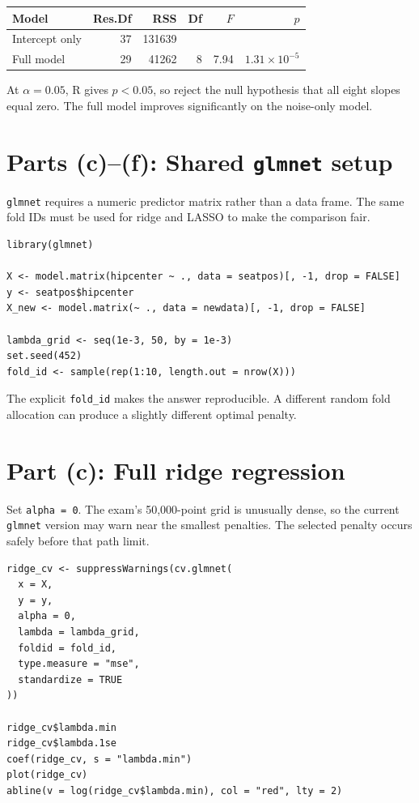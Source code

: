 ﻿\documentclass[11pt]{article}
\begin{document}
\begin{center}
\begin{tabular}{lrrrrr}
\toprule
\rowcolor{navy!10}\textbf{Model}&\textbf{Res.Df}&\textbf{RSS}&\textbf{Df}&\textbf{$F$}&\textbf{$p$}\\
\midrule
Intercept only&37&131639&&&\\
Full model&29&41262&8&7.94&$1.31\times10^{-5}$\\
\bottomrule
\end{tabular}
\end{center}

At $\alpha=0.05$, R gives $p<0.05$, so reject the null hypothesis that all
eight slopes equal zero. The full model improves significantly on the
noise-only model.

\section{Parts (c)--(f): Shared \texttt{glmnet} setup}

\texttt{glmnet} requires a numeric predictor matrix rather than a data frame.
The same fold IDs must be used for ridge and LASSO to make the comparison fair.

\begin{lstlisting}
library(glmnet)

X <- model.matrix(hipcenter ~ ., data = seatpos)[, -1, drop = FALSE]
y <- seatpos$hipcenter
X_new <- model.matrix(~ ., data = newdata)[, -1, drop = FALSE]

lambda_grid <- seq(1e-3, 50, by = 1e-3)
set.seed(452)
fold_id <- sample(rep(1:10, length.out = nrow(X)))
\end{lstlisting}

The explicit \texttt{fold\_id} makes the answer reproducible. A different random
fold allocation can produce a slightly different optimal penalty.

\section{Part (c): Full ridge regression}

Set \texttt{alpha = 0}. The exam's 50,000-point grid is unusually dense, so the
current \texttt{glmnet} version may warn near the smallest penalties. The selected
penalty occurs safely before that path limit.

\begin{lstlisting}
ridge_cv <- suppressWarnings(cv.glmnet(
  x = X,
  y = y,
  alpha = 0,
  lambda = lambda_grid,
  foldid = fold_id,
  type.measure = "mse",
  standardize = TRUE
))

ridge_cv$lambda.min
ridge_cv$lambda.1se
coef(ridge_cv, s = "lambda.min")
plot(ridge_cv)
abline(v = log(ridge_cv$lambda.min), col = "red", lty = 2)
\end{lstlisting}
\end{document}

